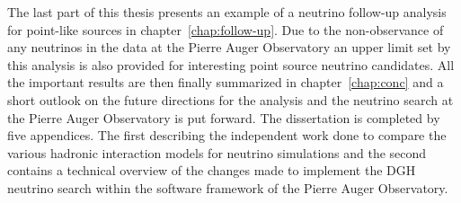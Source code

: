 The last part of this thesis presents an example of a neutrino follow-up analysis for point-like sources in chapter~\ref{chap:follow-up}. Due to the non-observance of any neutrinos in the data at the Pierre Auger Observatory an upper limit set by this analysis is also provided for interesting point source neutrino candidates. All the important results are then finally summarized in chapter~\ref{chap:conc} and a short outlook on the future directions for the analysis and the neutrino search at the Pierre Auger Observatory is put forward. The dissertation is completed by five appendices. The first describing the independent work done to compare the various hadronic interaction models for neutrino simulations and the second contains a technical overview of the changes made to implement the \gls{DGH} neutrino search within the software framework of the Pierre Auger Observatory. 

